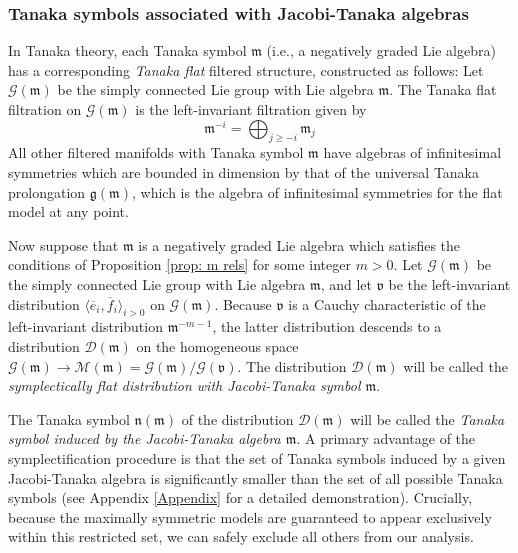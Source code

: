 \documentclass[11pt,letterpaper]{amsart}
\newcommand{\ND}[1]{\todo[inline,color=blue!10]{#1}}  %
\numberwithin{equation}{section}
\newcommand{\oline}{\overline}
\begin{document}
\subsubsection{Tanaka symbols associated with Jacobi-Tanaka algebras}
\label{subsubsection: symplectically flat}
In Tanaka theory, each Tanaka symbol $\mathfrak{m}$ (i.e., a negatively graded Lie algebra) has a corresponding \textit{Tanaka flat} filtered structure, constructed as follows: Let $\mathcal G(\mathfrak m)$ be the simply connected Lie group with Lie algebra $\mathfrak m$. The Tanaka flat filtration on $\mathcal G(\mathfrak m)$ is the left-invariant filtration given by
\begin{equation}
    \mathfrak m^{-i} = \bigoplus_{j\geq -i}\mathfrak m_j
\end{equation}
All other filtered manifolds with Tanaka symbol $\mathfrak m$ have algebras of infinitesimal symmetries which are bounded in dimension by that of the universal Tanaka prolongation $\mathfrak g(\mathfrak m)$, which is the algebra of infinitesimal symmetries for the flat model at any point\cite{Tanaka1970}\cite{Zelenko2009-qt}\cite{CapSlovak}.


Now suppose that $\mathfrak m$ is a negatively graded Lie algebra which satisfies the conditions of Proposition \ref{prop: m rels} for some integer $m>0$. Let $\mathcal G(\mathfrak m)$ be the simply connected Lie group with Lie algebra $\mathfrak m$, and let $\mathfrak v$ be the left-invariant distribution $\langle \oline e_i,\oline f_i\rangle_{i>0}$ on $\mathcal G(\mathfrak m)$. Because $\mathfrak v$ is a Cauchy characteristic of the left-invariant distribution $\mathfrak m^{-m-1}$, the latter distribution descends to a distribution $\mathcal D(\mathfrak m)$ on the homogeneous space $\mathcal G(\mathfrak m)\to \mathcal M(\mathfrak{\mathfrak m}) = \mathcal G(\mathfrak m)/\mathcal G(\mathfrak v)$. The distribution $\mathcal D(\mathfrak m)$ will be called the \emph{symplectically flat distribution with Jacobi-Tanaka symbol $\mathfrak m$}.

The Tanaka symbol $\mathfrak{n}(\mathfrak m)$ of the distribution $\mathcal{D}(\mathfrak m)$ will be called the \emph{Tanaka symbol induced by the Jacobi-Tanaka algebra $\mathfrak m$}. A primary advantage of the symplectification procedure is that the set of Tanaka symbols induced by a given Jacobi-Tanaka algebra is significantly smaller than the set of all possible Tanaka symbols (see Appendix \ref{Appendix} for a detailed demonstration). Crucially, because the maximally symmetric models are guaranteed to appear exclusively within this restricted set, we can safely exclude all others from our analysis.
\end{document}
